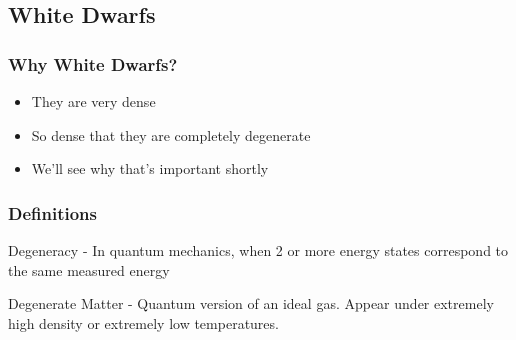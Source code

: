 \documentclass{beamer}
\begin{document}
        \subsection{White Dwarfs}

        \begin{frame}
            \frametitle{Why White Dwarfs?}

            \begin{itemize}
                \item They are very dense
                \pause
                \item So dense that they are completely degenerate
                \pause
                \item We'll see why that's important shortly
            \end{itemize}

        \end{frame}

        \begin{frame}
            \frametitle{Definitions}

            \begin{definition}
                \alert{Degeneracy} - In quantum mechanics, when 2 or more energy
                states correspond to the same measured energy
            \end{definition}

            \begin{definition}
                \alert{Degenerate Matter} - Quantum version of an ideal gas.
                Appear under extremely high density or extremely low
                temperatures.
            \end{definition}

        \end{frame}
\end{document}
